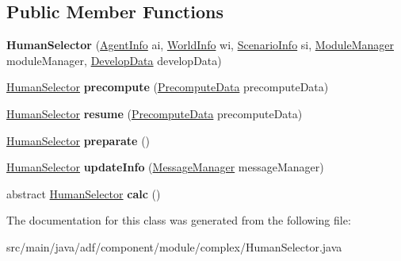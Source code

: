 \subsection*{Public Member Functions}
\begin{DoxyCompactItemize}
\item 
\hypertarget{classadf_1_1component_1_1module_1_1complex_1_1HumanSelector_a15c1bfebf9e8b8a6c2b2948cd65df4bb}{}\label{classadf_1_1component_1_1module_1_1complex_1_1HumanSelector_a15c1bfebf9e8b8a6c2b2948cd65df4bb} 
{\bfseries Human\+Selector} (\hyperlink{classadf_1_1agent_1_1info_1_1AgentInfo}{Agent\+Info} ai, \hyperlink{classadf_1_1agent_1_1info_1_1WorldInfo}{World\+Info} wi, \hyperlink{classadf_1_1agent_1_1info_1_1ScenarioInfo}{Scenario\+Info} si, \hyperlink{classadf_1_1agent_1_1module_1_1ModuleManager}{Module\+Manager} module\+Manager, \hyperlink{classadf_1_1agent_1_1develop_1_1DevelopData}{Develop\+Data} develop\+Data)
\item 
\hypertarget{classadf_1_1component_1_1module_1_1complex_1_1HumanSelector_aab8f2b1b49116c44c733f81939e12cda}{}\label{classadf_1_1component_1_1module_1_1complex_1_1HumanSelector_aab8f2b1b49116c44c733f81939e12cda} 
\hyperlink{classadf_1_1component_1_1module_1_1complex_1_1HumanSelector}{Human\+Selector} {\bfseries precompute} (\hyperlink{classadf_1_1agent_1_1precompute_1_1PrecomputeData}{Precompute\+Data} precompute\+Data)
\item 
\hypertarget{classadf_1_1component_1_1module_1_1complex_1_1HumanSelector_a34cda6e6b019c26ebfc14806185cb2c0}{}\label{classadf_1_1component_1_1module_1_1complex_1_1HumanSelector_a34cda6e6b019c26ebfc14806185cb2c0} 
\hyperlink{classadf_1_1component_1_1module_1_1complex_1_1HumanSelector}{Human\+Selector} {\bfseries resume} (\hyperlink{classadf_1_1agent_1_1precompute_1_1PrecomputeData}{Precompute\+Data} precompute\+Data)
\item 
\hypertarget{classadf_1_1component_1_1module_1_1complex_1_1HumanSelector_acaf2eba3095f73bac4a664e9c58bf1c6}{}\label{classadf_1_1component_1_1module_1_1complex_1_1HumanSelector_acaf2eba3095f73bac4a664e9c58bf1c6} 
\hyperlink{classadf_1_1component_1_1module_1_1complex_1_1HumanSelector}{Human\+Selector} {\bfseries preparate} ()
\item 
\hypertarget{classadf_1_1component_1_1module_1_1complex_1_1HumanSelector_a9dc59b731a3024201c0b400e32780f55}{}\label{classadf_1_1component_1_1module_1_1complex_1_1HumanSelector_a9dc59b731a3024201c0b400e32780f55} 
\hyperlink{classadf_1_1component_1_1module_1_1complex_1_1HumanSelector}{Human\+Selector} {\bfseries update\+Info} (\hyperlink{classadf_1_1agent_1_1communication_1_1MessageManager}{Message\+Manager} message\+Manager)
\item 
\hypertarget{classadf_1_1component_1_1module_1_1complex_1_1HumanSelector_a11a99067fd384b94baf3954805c33e66}{}\label{classadf_1_1component_1_1module_1_1complex_1_1HumanSelector_a11a99067fd384b94baf3954805c33e66} 
abstract \hyperlink{classadf_1_1component_1_1module_1_1complex_1_1HumanSelector}{Human\+Selector} {\bfseries calc} ()
\end{DoxyCompactItemize}


The documentation for this class was generated from the following file\+:\begin{DoxyCompactItemize}
\item 
src/main/java/adf/component/module/complex/Human\+Selector.\+java\end{DoxyCompactItemize}
